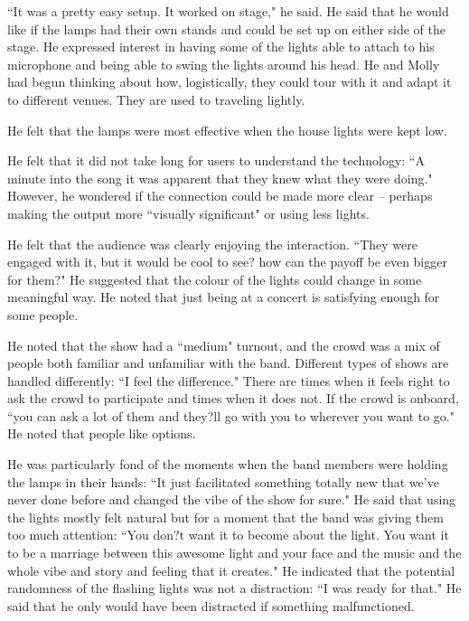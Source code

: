 ``It was a pretty easy setup. It worked on stage," he said. He said that he would like if the lamps had their own stands and could be set up on either side of the stage. He expressed interest in having some of the lights able to attach to his microphone and being able to swing the lights around his head. He and Molly had begun thinking about how, logistically, they could tour with it and adapt it to different venues. They are used to traveling lightly.

He felt that the lamps were most effective when the house lights were kept low.

He felt that it did not take long for users to understand the technology: ``A minute into the song it was apparent that they knew what they were doing." However, he wondered if the connection could be made more clear -- perhaps making the output more ``visually significant" or using less lights.

He felt that the audience was clearly enjoying the interaction. ``They were engaged with it, but it would be cool to see? how can the payoff be even bigger for them?" He suggested that the colour of the lights could change in some meaningful way. He noted that just being at a concert is satisfying enough for some people.

He noted that the show had a ``medium" turnout, and the crowd was a mix of people both familiar and unfamiliar with the band. Different types of shows are handled differently: ``I feel the difference." There are times when it feels right to ask the crowd to participate and times when it does not. If the crowd is onboard, ``you can ask a lot of them and they?ll go with you to wherever you want to go." He noted that people like options.

He was particularly fond of the moments when the band members were holding the lamps in their hands: ``It just facilitated something totally new that we've never done before and changed the vibe of the show for sure." He said that using the lights mostly felt natural but for a moment that the band was giving them too much attention: ``You don?t want it to become about the light. You want it to be a marriage between this awesome light and your face and the music and the whole vibe and story and feeling that it creates." He indicated that the potential randomness of the flashing lights was not a distraction: ``I was ready for that." He said that he only would have been distracted if something malfunctioned.

